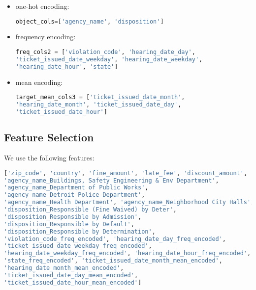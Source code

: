 \documentclass[12pt,letterpaper]{article}
\numberwithin{equation}{section}
\begin{document}
\begin{itemize}
\item one-hot encoding: 
\begin{lstlisting}[language=Python, basicstyle=\footnotesize]
object_cols=['agency_name', 'disposition']
\end{lstlisting}

\item frequency encoding: 
\begin{lstlisting}[language=Python, basicstyle=\footnotesize]
freq_cols2 = ['violation_code', 'hearing_date_day', 
'ticket_issued_date_weekday', 'hearing_date_weekday', 
'hearing_date_hour', 'state']
\end{lstlisting}

\item mean encoding:
\begin{lstlisting}[language=Python, basicstyle=\footnotesize]
target_mean_cols3 = ['ticket_issued_date_month', 
'hearing_date_month', 'ticket_issued_date_day', 
'ticket_issued_date_hour']
\end{lstlisting}

\end{itemize}



\subsection{Feature Selection}

We use the following features: 

\begin{lstlisting}[language=Python, basicstyle=\footnotesize ]
['zip_code', 'country', 'fine_amount', 'late_fee', 'discount_amount',
'agency_name_Buildings, Safety Engineering & Env Department',
'agency_name_Department of Public Works',
'agency_name_Detroit Police Department',
'agency_name_Health Department', 'agency_name_Neighborhood City Halls',
'disposition_Responsible (Fine Waived) by Deter',
'disposition_Responsible by Admission',
'disposition_Responsible by Default',
'disposition_Responsible by Determination',
'violation_code_freq_encoded', 'hearing_date_day_freq_encoded',
'ticket_issued_date_weekday_freq_encoded',
'hearing_date_weekday_freq_encoded', 'hearing_date_hour_freq_encoded',
'state_freq_encoded', 'ticket_issued_date_month_mean_encoded',
'hearing_date_month_mean_encoded',
'ticket_issued_date_day_mean_encoded',
'ticket_issued_date_hour_mean_encoded']
\end{lstlisting}
\end{document}
